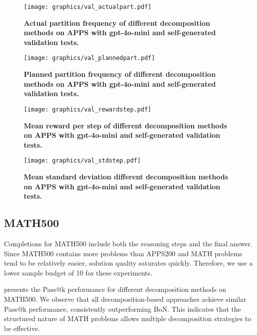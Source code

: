\begin{figure}[ht]
    \centering
    \texttt{[image: graphics/val\_actualpart.pdf]}
    \caption{\textbf{Actual partition frequency of different decomposition methods on APPS with gpt-4o-mini and self-generated validation tests.}}
    \label{fig:val_actualpart}
\end{figure}

\begin{figure}[ht]
    \centering
    \texttt{[image: graphics/val\_plannedpart.pdf]}
    \caption{\textbf{Planned partition frequency of different decomposition methods on APPS with gpt-4o-mini and self-generated validation tests.}}
    \label{fig:val_plannedpart}
\end{figure}


\begin{figure}[ht]
    \centering
    \texttt{[image: graphics/val\_rewardstep.pdf]}
    \caption{\textbf{Mean reward per step of different decomposition methods on APPS with gpt-4o-mini and self-generated validation tests.}}
    \label{fig:val_rewardstep}
\end{figure}

\begin{figure}[ht]
    \centering
    \texttt{[image: graphics/val\_stdstep.pdf]}
    \caption{\textbf{Mean standard deviation different decomposition methods on APPS with gpt-4o-mini and self-generated validation tests.}}
    \label{fig:val_stdstep}
\end{figure}


\newpage
\subsection{MATH500}
\label{sec:math500_extended}

Completions for MATH500 include both the reasoning steps and the final answer. Since MATH500 contains more problems than APPS200 and MATH problems tend to be relatively easier, solution quality saturates quickly. Therefore, we use a lower sample budget of 10 for these experiments. 

 presents the Pass@k performance for different decomposition methods on MATH500. We observe that all decomposition-based approaches achieve similar Pass@k performance, consistently outperforming BoN. This indicates that the structured nature of MATH problems allows multiple decomposition strategies to be effective.

